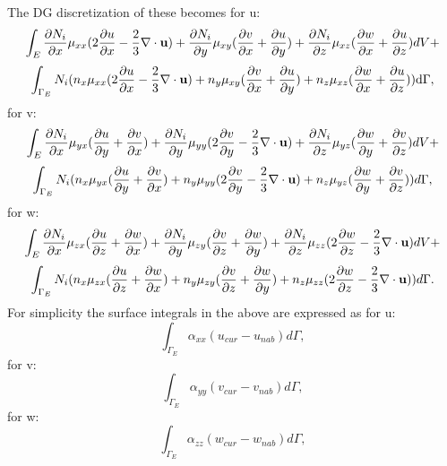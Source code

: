 The DG discretization of these becomes 
for u:
\begin{equation}
\int_E 
\frac{\partial N_i}{\partial x} \mu_{xx}
(
2\frac{\partial u}{\partial x}
-\frac{2}{3}\nabla\cdot{\bf u} 
)
+
\frac{\partial N_i}{\partial y} \mu_{xy}
(
\frac{\partial v}{\partial x}+\frac{\partial u}{\partial y})
+
\frac{\partial N_i}{\partial z} \mu_{xz}
(
\frac{\partial w}{\partial x}+\frac{\partial u}{\partial z})
 dV+
\label{visc-stress-u-Ni} 
\end{equation}
\begin{equation}
\int_{\Gamma_E} 
N_i ({n_x} \mu_{xx}
(
2\frac{\partial u}{\partial x}
-\frac{2}{3}\nabla\cdot{\bf u} 
)
+
 {n_y} \mu_{xy}
(
\frac{\partial v}{\partial x}+\frac{\partial u}{\partial y})
+
{n_z} \mu_{xz}
(
\frac{\partial w}{\partial x}+\frac{\partial u}{\partial z})
 )\mathrm{d}\Gamma,
\label{visc-stress-u-n} 
\end{equation}
for v:
\begin{equation}
\int_E 
\frac{\partial N_i}{\partial x} \mu_{yx}
(
\frac{\partial u}{\partial y}+\frac{\partial v}{\partial x}
)
+
\frac{\partial N_i} {\partial y}\mu_{yy}
(
2\frac{\partial v}{\partial y}
-\frac{2}{3}\nabla\cdot{\bf u} 
)
+
\frac{\partial N_i}{\partial z} \mu_{yz}
(
\frac{\partial w}{\partial y}+\frac{\partial v}{\partial z})
 dV+
\label{visc-stress-v-Ni} 
\end{equation}
\begin{equation}
\int_{\Gamma_E} 
N_i({n_x} \mu_{yx}
(
\frac{\partial u}{\partial y}+\frac{\partial v}{\partial x}
)
+
{n_y}\mu_{yy}
(
2\frac{\partial v}{\partial y}
-\frac{2}{3}\nabla\cdot{\bf u} 
)
+
{n_z} \mu_{yz}
(
\frac{\partial w}{\partial y}+\frac{\partial v}{\partial z})
 )d\Gamma,
\label{visc-stress-v-n} 
\end{equation}
for w:
\begin{equation}
\int_E 
\frac{\partial N_i}{\partial x} \mu_{zx}
(
\frac{\partial u}{\partial z}+\frac{\partial w}{\partial x})
+
\frac{\partial N_i}{\partial y} \mu_{zy}
(
\frac{\partial v}{\partial z}+\frac{\partial w}{\partial y})
+
\frac{\partial N_i}{\partial z} \mu_{zz}
(
2\frac{\partial w}{\partial z}
-\frac{2}{3}\nabla\cdot{\bf u} 
) dV  +
\label{visc-stress-w-Ni} 
\end{equation}
\begin{equation}
\int_{\Gamma_E} 
N_i ({n_x} \mu_{zx}
(
\frac{\partial u}{\partial z}+\frac{\partial w}{\partial x})
+
{n_y} \mu_{zy}
(
\frac{\partial v}{\partial z}+\frac{\partial w}{\partial y})
+
{n_z} \mu_{zz}
(
2\frac{\partial w}{\partial z}
-\frac{2}{3}\nabla\cdot{\bf u} 
) )d\Gamma. 
\label{visc-stress-w-n} 
\end{equation}
For simplicity the surface integrals in the above are 
expressed as for u:
\begin{equation}
\int_{\Gamma_E} \alpha_{xx} (u_{cur}-u_{nab}) d\Gamma,
\end{equation}
for v:
\begin{equation}
\int_{\Gamma_E} \alpha_{yy} (v_{cur}-v_{nab}) d\Gamma,
\end{equation}
for w:
\begin{equation}
\int_{\Gamma_E} \alpha_{zz} (w_{cur}-w_{nab}) d\Gamma,
\end{equation}

